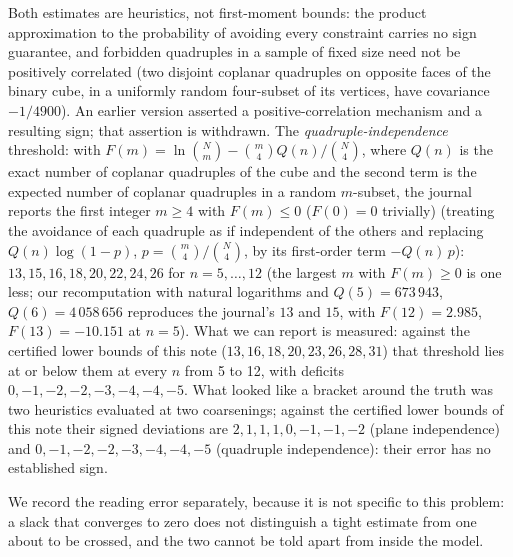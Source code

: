 \documentclass[11pt,a4paper]{article}
\begin{document}
Both estimates are heuristics, not first-moment bounds: the product approximation to the probability
of avoiding every constraint carries no sign guarantee, and forbidden quadruples in a sample of fixed
size need not be positively correlated (two disjoint coplanar quadruples on opposite faces of the
binary cube, in a uniformly random four-subset of its vertices, have covariance $-1/4900$).  An earlier
version asserted a positive-correlation mechanism and a resulting sign; that assertion is withdrawn.
The \emph{quadruple-independence} threshold: with $F(m)=\ln\binom{N}{m}-\binom{m}{4}Q(n)/\binom{N}{4}$, where
$Q(n)$ is the exact number of coplanar quadruples of the cube and the second term is the expected number of
coplanar quadruples in a random $m$-subset, the journal reports the first integer $m\ge4$ with $F(m)\le0$ ($F(0)=0$ trivially) (treating the
avoidance of each quadruple as if independent of the others and replacing $Q(n)\log(1-p)$, $p=\binom{m}{4}/\binom{N}{4}$, by its
first-order term $-Q(n)\,p$): $13,15,16,18,20,22,24,26$ for $n=5,\dots,12$ (the
largest $m$ with $F(m)\ge0$ is one less; our recomputation with natural logarithms and $Q(5)=673\,943$, $Q(6)=4\,058\,656$
reproduces the journal's $13$ and $15$, with $F(12)=2.985$, $F(13)=-10.151$ at $n=5$).  What we can
report is measured: against the certified lower bounds of this note ($13,16,18,20,23,26,28,31$) that threshold
lies at or below them at every $n$ from 5 to 12, with deficits $0,-1,-2,-2,-3,-4,-4,-5$.  What looked like a bracket around the truth was two heuristics
evaluated at two coarsenings; against the certified lower bounds of this note their signed deviations are
$2,1,1,1,0,-1,-1,-2$ (plane independence) and $0,-1,-2,-2,-3,-4,-4,-5$ (quadruple independence): their error
has no established sign.

We record the reading error separately, because it is not specific to this problem: a slack that
converges to zero does not distinguish a tight estimate from one about to be crossed, and the two
cannot be told apart from inside the model.
\end{document}
